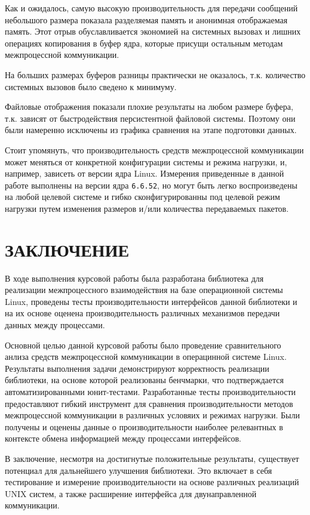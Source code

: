 \documentclass[14pt, russian]{scrartcl}
\newcommand{\anonsection}[1]{\cleardoublepage
\phantomsection
\addcontentsline{toc}{section}{\protect\numberline{}#1}
\section*{#1}\vspace*{2.5ex} %
}
\begin{document}
Как и ожидалось, самую высокую производительность для передачи сообщений
небольшого размера показала разделяемая память и анонимная отображаемая память.
Этот отрыв обуславливается экономией на системных вызовах и лишних операциях
копирования в буфер ядра, которые присущи остальным методам межпроцессной
коммуникации.

На больших размерах буферов разницы практически не оказалось, т.к. количество
системных вызовов было сведено к минимуму.

Файловые отображения показали плохие результаты на любом размере буфера, т.к.
зависят от быстродействия персистентной файловой системы. Поэтому они были
намеренно исключены из графика сравнения на этапе подготовки данных.

Стоит упомянуть, что производительность средств межпроцессной коммуникации может
меняться от конкретной конфигурации системы и режима нагрузки, и, например,
зависеть от версии ядра Linux. Измерения приведенные в данной работе выполнены
на версии ядра \verb|6.6.52|, но могут быть легко воспроизведены на любой
целевой системе и гибко сконфигурированны под целевой режим нагрузки путем
изменения размеров и/или количества передаваемых пакетов.

\newpage
\anonsection{ЗАКЛЮЧЕНИЕ}  %

В ходе выполнения курсовой работы была разработана библиотека для реализации
межпроцессного взаимодействия на базе операционной системы Linux, проведены
тесты производительности интерфейсов данной библиотеки и на их основе оценена
производительность различных механизмов передачи данных между процессами.

Основной целью данной курсовой работы было проведение сравнительного анлиза
средств межпроцессной коммуникации в операцинной системе Linux. Результаты
выполнения задачи демонстрируют корректность реализации библиотеки, на основе
которой реализованы бенчмарки, что подтверждается автоматизированными
юнит-тестами. Разработанные тесты производительности предоставляют гибкий
инструмент для сравнения производительности методов межпроцессной коммуникации в
различных условяих и режимах нагрузки. Были получены и оценены данные о
производительности наиболее релевантных в контексте обмена информацией между
процессами интерфейсов.

В заключение, несмотря на достигнутые положительные результаты, существует
потенциал для дальнейшего улучшения библиотеки. Это включает в себя тестирование
и измерение производительности на основе различных реализаций UNIX систем, а
также расширение интерфейса для двунаправленной коммуникации.
\end{document}
